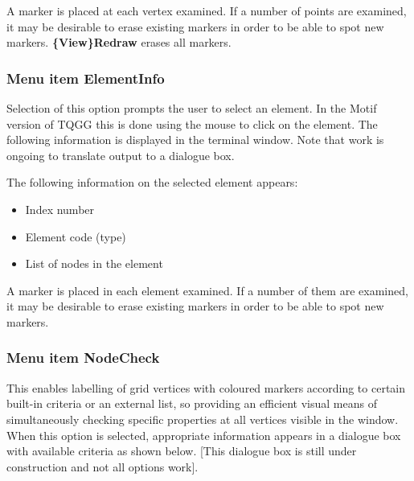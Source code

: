 \documentclass{article}
\begin{document}
A marker is placed at each vertex examined. If a number of points are examined, it may be desirable to erase existing markers in order to be able to spot new markers. \textbf{\{View\}Redraw} erases all markers.


\subsubsection{Menu item ElementInfo}
Selection of this option prompts the user to select an element.  In the Motif version of TQGG this is done using the mouse to click on the element.  The following information is displayed in the terminal window.  Note that work is ongoing to translate output to a dialogue box.

The following information on the selected element appears:

\begin{itemize}
\item Index number
\item Element code (type)
\item List of nodes in the element 
\end{itemize}
A marker is placed in each element examined. If a number of them are examined, it may be desirable to erase existing markers in order to be able to spot new markers.


\subsubsection{Menu item NodeCheck}
This enables labelling of grid vertices with coloured markers according to certain built-in criteria or an external list, so providing an efficient visual means of simultaneously checking specific properties at all vertices visible in the window. When this option is selected, appropriate information appears in a dialogue box with available criteria as shown below. [This dialogue box is still under construction and not all options work].
\\ \\
\end{document}
